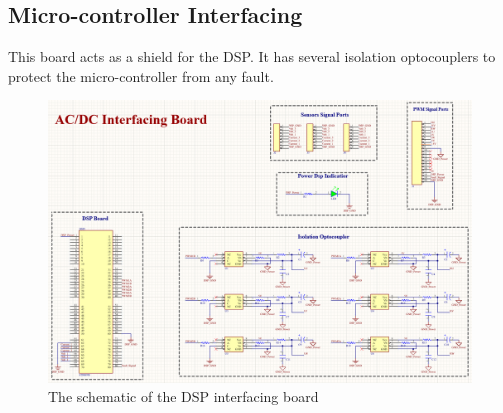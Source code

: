 \documentclass[12pt,a4paper]{book}
\begin{document}

\subsection{Micro-controller Interfacing}
This board acts as a shield for the DSP. It has several isolation optocouplers to protect the micro-controller from any fault.
\begin{figure}[ht]
  \centering
  \includegraphics[width = 15cm]{image42.png}
  \caption{The schematic of the DSP interfacing board}
  \label{fig:image42}
\end{figure}
\end{document}
